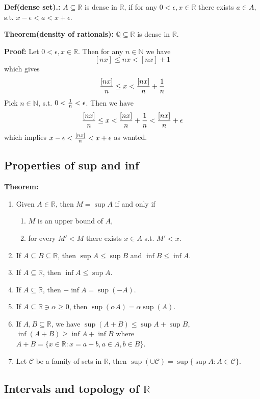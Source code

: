 \documentclass{article}
\begin{document}
\textbf{Def(dense set).:} $A\subseteq \mathbb{R}$ is dense in $\mathbb{R}$, if for any $0<\epsilon, x\in \mathbb{R}$ there exists $a\in A$, s.t. $x-\epsilon<a<x+\epsilon$.

\textbf{Theorem(density of rationals):} $\mathbb{Q\subseteq\mathbb{R}}$ is dense in $\mathbb{R}$.

\textbf{Proof:} Let $0<\epsilon, x\in \mathbb{R}$. Then for any $n\in \mathbb{N}$ we have 
\[
[nx]\leq nx<[nx] + 1
\]
which gives
\[
{[nx]\over n}\leq x <{[nx]\over n} + {1\over n}
\]
Pick $n\in \mathbb{N}$, s.t. $0<{1\over n}<\epsilon$. Then we have
\[
{[nx]\over n}\leq x <{[nx]\over n} +{1\over n}<{[nx]\over n} +\epsilon
\]
which implies $x-\epsilon<{[nx]\over n} <x+\epsilon$ as wanted.

\subsection{Properties of sup and inf}

\textbf{Theorem:} 
\begin{enumerate}
    \item Given $A\in \mathbb{R}$, then $M=\sup A$ if and only if
    \begin{enumerate}
        \item $M$ is an upper bound of $A$, 
        \item for every $M' < M$ there exists $x\in A$ s.t. $M'<x$.
    \end{enumerate}
    \item If $A\subseteq B\subseteq \mathbb{R}$, then $\sup A\leq \sup B$ and $\inf B\leq \inf A$.
    \item If $A\subseteq \mathbb{R}$, then $\inf A\leq \sup A$.
    \item If $A\subseteq \mathbb{R}$, then $-\inf A = \sup (-A)$.
    \item If $A\subseteq \mathbb{R} \ni \alpha\geq 0$, then $\sup (\alpha A)=\alpha\sup (A)$.
    \item If $A, B \subseteq \mathbb{R}$, we have $\sup (A+B)\leq \sup A + \sup B$, $\inf (A+B)\geq \inf A+\inf B$ where $A+B=\{x\in \mathbb{R}:x=a+b, a\in A, b\in B\}$.
    \item Let $\mathcal{C}$ be a family of sets in $\mathbb{R}$, then $\sup (\cup \mathcal{C}) = \sup \{\sup A:A\in \mathcal{C}\}$.
\end{enumerate}

\subsection{Intervals and topology of $\mathbb{R}$}
\end{document}
